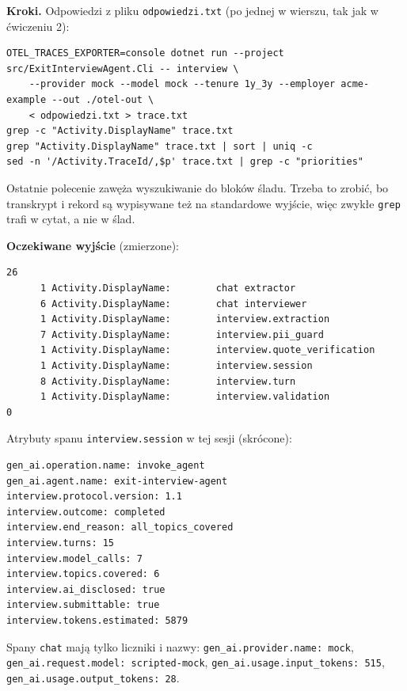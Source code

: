 {\textbf{Kroki.} Odpowiedzi z pliku \texttt{odpowiedzi.txt} (po jednej w wierszu,
tak jak w ćwiczeniu 2):

\begin{Verbatim}[fontsize=\scriptsize,frame=single,framesep=2mm]
OTEL_TRACES_EXPORTER=console dotnet run --project src/ExitInterviewAgent.Cli -- interview \
    --provider mock --model mock --tenure 1y_3y --employer acme-example --out ./otel-out \
    < odpowiedzi.txt > trace.txt
grep -c "Activity.DisplayName" trace.txt
grep "Activity.DisplayName" trace.txt | sort | uniq -c
sed -n '/Activity.TraceId/,$p' trace.txt | grep -c "priorities"
\end{Verbatim}

Ostatnie polecenie zawęża wyszukiwanie do bloków śladu. Trzeba to zrobić, bo
transkrypt i rekord są wypisywane też na standardowe wyjście, więc zwykłe
\texttt{grep} trafi w cytat, a nie w ślad.

\textbf{Oczekiwane wyjście} (zmierzone):

\begin{Verbatim}[fontsize=\scriptsize,frame=single,framesep=2mm]
26
      1 Activity.DisplayName:        chat extractor
      6 Activity.DisplayName:        chat interviewer
      1 Activity.DisplayName:        interview.extraction
      7 Activity.DisplayName:        interview.pii_guard
      1 Activity.DisplayName:        interview.quote_verification
      1 Activity.DisplayName:        interview.session
      8 Activity.DisplayName:        interview.turn
      1 Activity.DisplayName:        interview.validation
0
\end{Verbatim}

Atrybuty spanu \texttt{interview.session} w tej sesji (skrócone):

\begin{Verbatim}[fontsize=\scriptsize,frame=single,framesep=2mm]
gen_ai.operation.name: invoke_agent
gen_ai.agent.name: exit-interview-agent
interview.protocol.version: 1.1
interview.outcome: completed
interview.end_reason: all_topics_covered
interview.turns: 15
interview.model_calls: 7
interview.topics.covered: 6
interview.ai_disclosed: true
interview.submittable: true
interview.tokens.estimated: 5879
\end{Verbatim}

Spany \texttt{chat} mają tylko liczniki i nazwy: \texttt{gen\_ai.provider.name: mock},
\texttt{gen\_ai.request.model: scripted-mock}, \texttt{gen\_ai.usage.input\_tokens: 515},
\texttt{gen\_ai.usage.output\_tokens: 28}.

}
